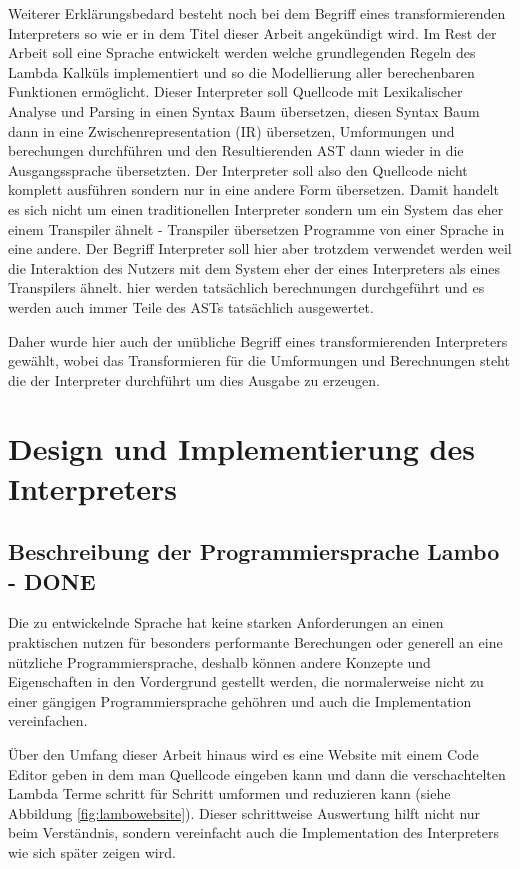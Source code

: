 \documentclass[ngerman]{article}
\begin{document}
Weiterer Erklärungsbedard besteht noch bei dem Begriff eines transformierenden Interpreters so wie er in dem Titel dieser Arbeit angekündigt wird. Im Rest der Arbeit soll eine Sprache entwickelt werden welche grundlegenden Regeln des Lambda Kalküls implementiert und so die Modellierung aller berechenbaren Funktionen ermöglicht. Dieser Interpreter soll Quellcode mit Lexikalischer Analyse und Parsing in einen Syntax Baum übersetzen, diesen Syntax Baum dann in eine Zwischenrepresentation (IR) übersetzen, Umformungen und berechungen durchführen und den Resultierenden AST dann wieder in die Ausgangssprache übersetzten. Der Interpreter soll also den Quellcode nicht komplett ausführen sondern nur in eine andere Form übersetzen. Damit handelt es sich nicht um einen traditionellen Interpreter sondern um ein System das eher einem Transpiler ähnelt - Transpiler übersetzen Programme von einer Sprache in eine andere. Der Begriff Interpreter soll hier aber trotzdem verwendet werden weil die Interaktion des Nutzers mit dem System eher der eines Interpreters als eines Transpilers ähnelt. hier werden tatsächlich berechnungen durchgeführt und es werden auch immer Teile des ASTs tatsächlich ausgewertet.

Daher wurde hier auch der unübliche Begriff eines transformierenden Interpreters gewählt, wobei das Transformieren für die Umformungen und Berechnungen steht die der Interpreter durchführt um dies Ausgabe zu erzeugen.

\section{Design und Implementierung des Interpreters}

\subsection{Beschreibung der Programmiersprache Lambo - DONE}

Die zu entwickelnde Sprache hat keine starken Anforderungen an einen praktischen nutzen für besonders performante Berechungen oder generell an eine nützliche Programmiersprache, deshalb können andere Konzepte und Eigenschaften in den Vordergrund gestellt werden, die normalerweise nicht zu einer gängigen Programmiersprache gehöhren und auch die Implementation vereinfachen.

Über den Umfang dieser Arbeit hinaus wird es eine Website mit einem Code Editor geben in dem man Quellcode eingeben kann und dann die verschachtelten Lambda Terme schritt für Schritt umformen und reduzieren kann (siehe Abbildung \ref*{fig:lambowebsite}). Dieser schrittweise Auswertung hilft nicht nur beim Verständnis, sondern vereinfacht auch die Implementation des Interpreters wie sich später zeigen wird.
\end{document}
